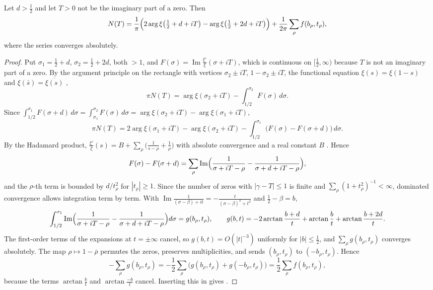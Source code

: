\begin{lemma}\label{lem:identity}
Let $d>\frac12$ and let $T>0$ not be the imaginary part of a zero. Then
\begin{equation}
N(T)=\frac1\pi\Bigl(2\arg\xi\bigl(\tfrac12+d+iT\bigr)-\arg\xi\bigl(\tfrac12+2d+iT\bigr)\Bigr)+\frac1{2\pi}\sum_\rho f(b_\rho,t_\rho),
\label{eq:identity}
\end{equation}
where the series converges absolutely.
\end{lemma}

\begin{proof}
Put $\sigma_1=\frac12+d$, $\sigma_2=\frac12+2d$, both $>1$, and $F(\sigma)=\operatorname{Im}\frac{\xi'}\xi(\sigma+iT)$, which is continuous on $[\frac12,\infty)$ because $T$ is not an imaginary part of a zero. By the argument principle on the rectangle with vertices $\sigma_2\pm iT$, $1-\sigma_2\pm iT$, the functional equation $\xi(s)=\xi(1-s)$ and $\xi(\bar s)=\overline{\xi(s)}$ \cite[Ch.~15]{Davenport2000},
\[
\pi N(T)=\arg\xi(\sigma_2+iT)-\int_{1/2}^{\sigma_2}F(\sigma)\,d\sigma .
\]
Since $\int_{1/2}^{\sigma_1}F(\sigma+d)\,d\sigma=\int_{\sigma_1}^{\sigma_2}F(\sigma)\,d\sigma=\arg\xi(\sigma_2+iT)-\arg\xi(\sigma_1+iT)$,
\begin{equation}
\pi N(T)=2\arg\xi(\sigma_1+iT)-\arg\xi(\sigma_2+iT)-\int_{1/2}^{\sigma_1}\bigl(F(\sigma)-F(\sigma+d)\bigr)\,d\sigma .
\label{eq:turing_split}
\end{equation}
By the Hadamard product, $\frac{\xi'}\xi(s)=B+\sum_\rho\bigl(\frac1{s-\rho}+\frac1\rho\bigr)$ with absolute convergence and a real constant $B$ \cite[Ch.~12]{Davenport2000}. Hence
\[
F(\sigma)-F(\sigma+d)=\sum_\rho\operatorname{Im}\Bigl(\frac1{\sigma+iT-\rho}-\frac1{\sigma+d+iT-\rho}\Bigr),
\]
and the $\rho$-th term is bounded by $d/t_\rho^2$ for $|t_\rho|\ge1$. Since the number of zeros with $|\gamma-T|\le1$ is finite and $\sum_\rho(1+t_\rho^2)^{-1}<\infty$, dominated convergence allows integration term by term. With $\operatorname{Im}\frac1{(\sigma-\beta)+it}=-\frac t{(\sigma-\beta)^2+t^2}$ and $\frac12-\beta=b$,
\[
\int_{1/2}^{\sigma_1}\operatorname{Im}\Bigl(\frac1{\sigma+iT-\rho}-\frac1{\sigma+d+iT-\rho}\Bigr)d\sigma=g(b_\rho,t_\rho),\qquad g(b,t)=-2\arctan\frac{b+d}t+\arctan\frac bt+\arctan\frac{b+2d}t .
\]
The first-order terms of the expansions at $t=\pm\infty$ cancel, so $g(b,t)=O(|t|^{-3})$ uniformly for $|b|\le\frac12$, and $\sum_\rho g(b_\rho,t_\rho)$ converges absolutely. The map $\rho\mapsto1-\bar\rho$ permutes the zeros, preserves multiplicities, and sends $(b_\rho,t_\rho)$ to $(-b_\rho,t_\rho)$. Hence
\[
-\sum_\rho g(b_\rho,t_\rho)=-\frac12\sum_\rho\bigl(g(b_\rho,t_\rho)+g(-b_\rho,t_\rho)\bigr)=\frac12\sum_\rho f(b_\rho,t_\rho),
\]
because the terms $\arctan\frac bt$ and $\arctan\frac{-b}t$ cancel. Inserting this in  gives .
\end{proof}

